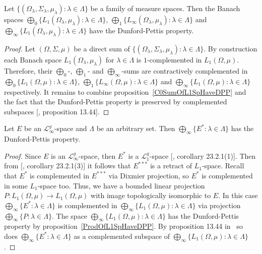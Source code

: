 \begin{proposition}\label{ProdOfL1SpHaveDPP} Let $
\{(\Omega_\lambda,\Sigma_\lambda,\mu_\lambda):\lambda\in\Lambda \}$ be a family
of measure spaces. 
Then the Banach spaces  
$\bigoplus_0 \{
    L_1(\Omega_\lambda, \mu_\lambda):\lambda\in\Lambda
 \}$, 
 $\bigoplus_1 \{
     L_\infty(\Omega_\lambda, \mu_\lambda):\lambda\in\Lambda
 \}$ 
and $\bigoplus_\infty \{
    L_1(\Omega_\lambda,\mu_\lambda):\lambda\in\Lambda
 \}$ have the Dunford-Pettis property.
\end{proposition}
\begin{proof} Let $(\Omega, \Sigma, \mu)$ be a direct sum of $
\{(\Omega_\lambda,\Sigma_\lambda,\mu_\lambda):\lambda\in\Lambda \}$. By
construction each Banach space $L_1(\Omega_\lambda,\mu_\lambda)$ for
$\lambda\in\Lambda$ is $1$-complemented in $L_1(\Omega, \mu)$. Therefore, their
$\bigoplus_0$-, $\bigoplus_1$- and $\bigoplus_\infty$-sums are contractively
complemented in $\bigoplus_0 \{L_1(\Omega, \mu):\lambda\in\Lambda \}$,
$\bigoplus_1 \{L_\infty(\Omega, \mu):\lambda\in\Lambda \}$ 
and $\bigoplus_\infty \{L_1(\Omega,\mu):\lambda\in\Lambda \}$ respectively. 
It remains to combine proposition~\ref{C0SumOfL1SpHaveDPP} and the fact 
that the Dunford-Pettis property is preserved by complemented 
subspaces [\cite{FabHabBanSpTh}, proposition 13.44].
\end{proof}

\begin{proposition}\label{ProdOfDualsOfMthscrLInftySpHaveDPP} Let $E$ be an
$\mathscr{L}_\infty^g$-space and $\Lambda$ be an arbitrary set. Then
$\bigoplus_\infty \{E^*:\lambda\in\Lambda \}$ has the Dunford-Pettis property.
\end{proposition}
\begin{proof} Since $E$ is an $\mathscr{L}_\infty^g$-space, then $E^*$ is a
$\mathscr{L}_{1}^g$-space [\cite{DefFloTensNorOpId}, corollary 23.2.1(1)]. Then
from [\cite{DefFloTensNorOpId}, corollary 23.2.1(3)] it follows that $E^{***}$
is a retract of $L_1$-space. Recall that $E^*$ is complemented in $E^{***}$ via
Dixmier projection, so $E^*$ is complemented in some $L_1$-space too. Thus, we
have a bounded linear projection $P:L_1(\Omega,\mu)\to L_1(\Omega,\mu)$ with
image topologically isomorphic to $E$. In this 
case $\bigoplus_\infty \{E^*:\lambda\in\Lambda \}$ is complemented 
in $\bigoplus_\infty \{ L_1(\Omega,\mu):\lambda\in\Lambda \}$ via 
projection $\bigoplus_\infty \{P:\lambda\in\Lambda \}$. The 
space $\bigoplus_\infty \{ L_1(\Omega,\mu):\lambda\in\Lambda \}$ has 
the Dunford-Pettis property by proposition~\ref{ProdOfL1SpHaveDPP}. By 
proposition 13.44 in~\cite{FabHabBanSpTh} so does 
$\bigoplus_\infty \{ E^*:\lambda\in\Lambda \}$ as a complemented subspace 
of $\bigoplus_\infty \{ L_1(\Omega,\mu):\lambda\in\Lambda \}$.
\end{proof}

